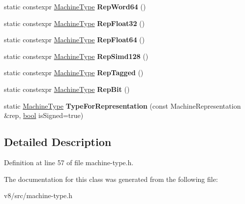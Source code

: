 \begin{DoxyCompactItemize}
\item 
\mbox{\label{classv8_1_1internal_1_1MachineType_ad48c4b6be8f45940169cd47a3cae6318}} 
static constexpr \mbox{\hyperlink{classv8_1_1internal_1_1MachineType}{Machine\+Type}} {\bfseries Rep\+Word64} ()
\item 
\mbox{\label{classv8_1_1internal_1_1MachineType_aa88a66e6453149cc59baa67dba94d317}} 
static constexpr \mbox{\hyperlink{classv8_1_1internal_1_1MachineType}{Machine\+Type}} {\bfseries Rep\+Float32} ()
\item 
\mbox{\label{classv8_1_1internal_1_1MachineType_aa5e9a4fca2702fbe21de190c0be52f33}} 
static constexpr \mbox{\hyperlink{classv8_1_1internal_1_1MachineType}{Machine\+Type}} {\bfseries Rep\+Float64} ()
\item 
\mbox{\label{classv8_1_1internal_1_1MachineType_a19d8d213fb449e91d3cca7f06254e852}} 
static constexpr \mbox{\hyperlink{classv8_1_1internal_1_1MachineType}{Machine\+Type}} {\bfseries Rep\+Simd128} ()
\item 
\mbox{\label{classv8_1_1internal_1_1MachineType_a587950689574db7f4d8849a3ba751823}} 
static constexpr \mbox{\hyperlink{classv8_1_1internal_1_1MachineType}{Machine\+Type}} {\bfseries Rep\+Tagged} ()
\item 
\mbox{\label{classv8_1_1internal_1_1MachineType_a80122d9f29d26da9675a75df262aa21f}} 
static constexpr \mbox{\hyperlink{classv8_1_1internal_1_1MachineType}{Machine\+Type}} {\bfseries Rep\+Bit} ()
\item 
\mbox{\label{classv8_1_1internal_1_1MachineType_a0aa076bb1ee424c7a942d53c8692b922}} 
static \mbox{\hyperlink{classv8_1_1internal_1_1MachineType}{Machine\+Type}} {\bfseries Type\+For\+Representation} (const Machine\+Representation \&rep, \mbox{\hyperlink{classbool}{bool}} is\+Signed=true)
\end{DoxyCompactItemize}


\subsection{Detailed Description}


Definition at line 57 of file machine-\/type.\+h.



The documentation for this class was generated from the following file\+:\begin{DoxyCompactItemize}
\item 
v8/src/machine-\/type.\+h\end{DoxyCompactItemize}
